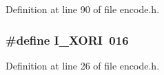 Definition at line 90 of file encode.\+h.

\subsubsection[{I\+\_\+\+X\+O\+RI}]{\setlength{\rightskip}{0pt plus 5cm}\#define I\+\_\+\+X\+O\+RI~016}\label{encode_8h_aa4d9838510b6c133834b45ddf2ef7c5c}


Definition at line 26 of file encode.\+h.

